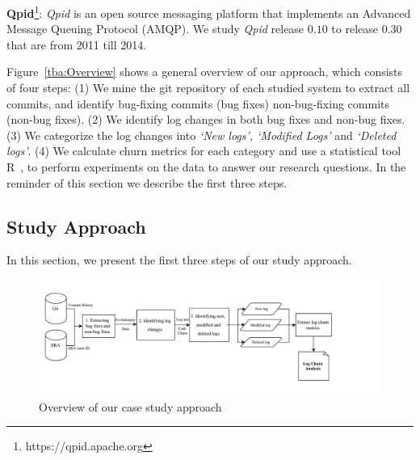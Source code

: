 {\textbf{Qpid}\footnote[3]{https://qpid.apache.org}}: \emph{Qpid} is an open source messaging platform that implements an Advanced Message Queuing Protocol (AMQP). We study \emph{Qpid} release $0.10$ to release $0.30$ that are from 2011 till 2014.


Figure~\ref{tba:Overview} shows a general overview of our approach, which consists of four steps: (1) We mine the git repository of each studied system to extract all commits, and identify bug-fixing commits (bug fixes) non-bug-fixing commits (non-bug fixes). (2) We identify log changes in both bug fixes and non-bug fixes. (3) We categorize the log changes into \textsl{`New logs', `Modified Logs'} and \textsl{`Deleted logs'}. (4) We calculate churn metrics for each category and use a statistical tool R~\cite{ihaka1996r}, to perform experiments on the data to answer our research questions.  In the reminder of this section we describe the first three steps.



\subsection{Study Approach}

In this section, we present the first three steps of our study approach. 
\begin{figure}[t]
	\centering
	\includegraphics[scale=0.45]{MethdologyICESEM}
	\caption{Overview of our case study approach }
	\label{fig:MethodologyICSME}
\end{figure}

